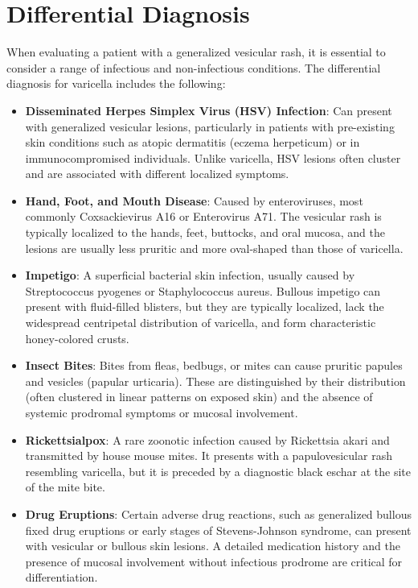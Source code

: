 \section*{Differential Diagnosis}
When evaluating a patient with a generalized vesicular rash, it is essential to consider a range of infectious and non-infectious conditions. The differential diagnosis for varicella includes the following:

\begin{itemize}
    \item \textbf{Disseminated Herpes Simplex Virus (HSV) Infection}: Can present with generalized vesicular lesions, particularly in patients with pre-existing skin conditions such as atopic dermatitis (eczema herpeticum) or in immunocompromised individuals. Unlike varicella, HSV lesions often cluster and are associated with different localized symptoms.
    \item \textbf{Hand, Foot, and Mouth Disease}: Caused by enteroviruses, most commonly Coxsackievirus A16 or Enterovirus A71. The vesicular rash is typically localized to the hands, feet, buttocks, and oral mucosa, and the lesions are usually less pruritic and more oval-shaped than those of varicella.
    \item \textbf{Impetigo}: A superficial bacterial skin infection, usually caused by Streptococcus pyogenes or Staphylococcus aureus. Bullous impetigo can present with fluid-filled blisters, but they are typically localized, lack the widespread centripetal distribution of varicella, and form characteristic honey-colored crusts.
    \item \textbf{Insect Bites}: Bites from fleas, bedbugs, or mites can cause pruritic papules and vesicles (papular urticaria). These are distinguished by their distribution (often clustered in linear patterns on exposed skin) and the absence of systemic prodromal symptoms or mucosal involvement.
    \item \textbf{Rickettsialpox}: A rare zoonotic infection caused by Rickettsia akari and transmitted by house mouse mites. It presents with a papulovesicular rash resembling varicella, but it is preceded by a diagnostic black eschar at the site of the mite bite.
    \item \textbf{Drug Eruptions}: Certain adverse drug reactions, such as generalized bullous fixed drug eruptions or early stages of Stevens-Johnson syndrome, can present with vesicular or bullous skin lesions. A detailed medication history and the presence of mucosal involvement without infectious prodrome are critical for differentiation.

\end{itemize}
